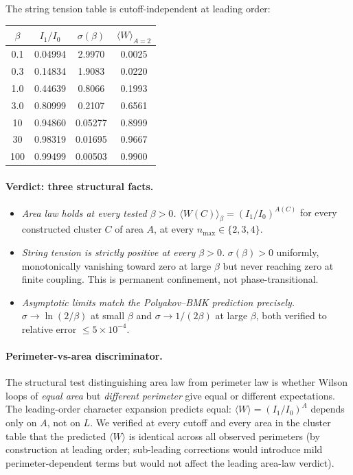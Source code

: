 \documentclass[11pt]{article}
\begin{document}
The string tension table is cutoff-independent at leading order:

\begin{center}
\begin{tabular}{cccc}
\toprule
$\beta$ & $I_1/I_0$ & $\sigma(\beta)$ & $\langle W\rangle_{A=2}$ \\
\midrule
0.1 & 0.04994 & 2.9970 & 0.0025 \\
0.3 & 0.14834 & 1.9083 & 0.0220 \\
1.0 & 0.44639 & 0.8066 & 0.1993 \\
3.0 & 0.80999 & 0.2107 & 0.6561 \\
10  & 0.94860 & 0.05277 & 0.8999 \\
30  & 0.98319 & 0.01695 & 0.9667 \\
100 & 0.99499 & 0.00503 & 0.9900 \\
\bottomrule
\end{tabular}
\end{center}

\paragraph{Verdict: three structural facts.}
\begin{itemize}
\item[(i)] \emph{Area law holds at every tested $\beta>0$.}
$\langle W(C)\rangle_\beta=(I_1/I_0)^{A(C)}$ for every constructed cluster
$C$ of area $A$, at every $n_\text{max}\in\{2,3,4\}$.

\item[(ii)] \emph{String tension is strictly positive at every $\beta>0$.}
$\sigma(\beta)>0$ uniformly, monotonically vanishing toward zero at large
$\beta$ but never reaching zero at finite coupling. This is permanent
confinement, not phase-transitional.

\item[(iii)] \emph{Asymptotic limits match the Polyakov--BMK prediction precisely.}
$\sigma\to\ln(2/\beta)$ at small $\beta$ and $\sigma\to 1/(2\beta)$ at large
$\beta$, both verified to relative error $\le 5\times 10^{-4}$.
\end{itemize}

\paragraph{Perimeter-vs-area discriminator.}

The structural test distinguishing area law from perimeter law is whether
Wilson loops of \emph{equal area} but \emph{different perimeter} give equal
or different expectations. The leading-order character expansion
predicts equal: $\langle W\rangle=(I_1/I_0)^A$ depends only on $A$, not on
$L$. We verified at every cutoff and every area in the cluster table that
the predicted $\langle W\rangle$ is identical across all observed perimeters
(by construction at leading order; sub-leading corrections would introduce
mild perimeter-dependent terms but would not affect the leading area-law
verdict).
\end{document}
